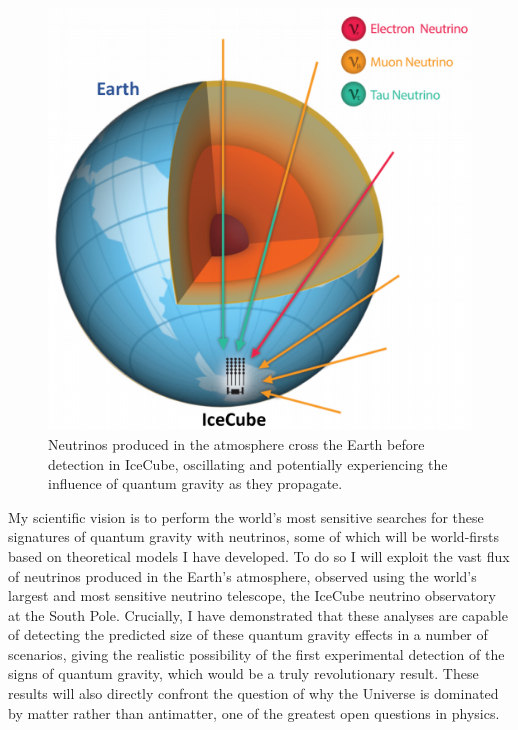 \documentclass[a4paper,11pt]{article}
\begin{document}
\begin{figure} %
    \centering
		\includegraphics[width=1.\linewidth]{images/atmo_osc.png}
		\caption{Neutrinos produced in the atmosphere cross the Earth before detection in IceCube, oscillating and potentially experiencing the influence of quantum gravity as they propagate.}
		\vspace{-7pt}
		\label{fig:osc}
\end{figure}

My scientific vision is to perform the world's most sensitive searches for these signatures of quantum gravity with neutrinos, some of which will be world-firsts based on theoretical models I have developed. To do so I will exploit the vast flux of neutrinos produced in the Earth's atmosphere, observed using the world's largest and most sensitive neutrino telescope, the IceCube neutrino observatory at the South Pole. Crucially, I have demonstrated that these analyses are capable of detecting the predicted size of these quantum gravity effects in a number of scenarios, giving the realistic possibility of the first experimental detection of the signs of quantum gravity, which would be a truly revolutionary result. These results will also directly confront the question of why the Universe is dominated by matter rather than antimatter, one of the greatest open questions in physics.
\end{document}
